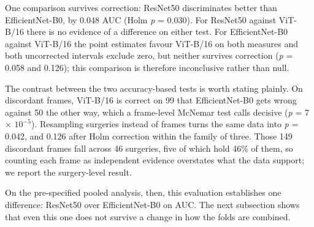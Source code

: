 \documentclass[preprint,12pt]{elsarticle}
\begin{document}
\begin{table}[t]
\centering
\caption{Pairwise comparison on the pooled out-of-fold predictions. Intervals and the first two \emph{p}-columns use surgery-level resampling; Holm correction is applied within the family of three comparisons.}
\label{tab:2}
\small
\setlength{\tabcolsep}{4pt}
\end{table}

One comparison survives correction: ResNet50 discriminates better than EfficientNet-B0, by 0.048 AUC (Holm \emph{p} = 0.030). For ResNet50 against ViT-B/16 there is no evidence of a difference on either test. For EfficientNet-B0 against ViT-B/16 the point estimates favour ViT-B/16 on both measures and both uncorrected intervals exclude zero, but neither survives correction (\emph{p} = 0.058 and 0.126); this comparison is therefore inconclusive rather than null.

The contrast between the two accuracy-based tests is worth stating plainly. On discordant frames, ViT-B/16 is correct on 99 that EfficientNet-B0 gets wrong against 50 the other way, which a frame-level McNemar test calls decisive (\emph{p} = 7 $\times$ $10^{-5}$). Resampling surgeries instead of frames turns the same data into \emph{p} = 0.042, and 0.126 after Holm correction within the family of three. Those 149 discordant frames fall across 46 surgeries, five of which hold 46\% of them, so counting each frame as independent evidence overstates what the data support; we report the surgery-level result.

On the pre-specified pooled analysis, then, this evaluation establishes one difference: ResNet50 over EfficientNet-B0 on AUC. The next subsection shows that even this one does not survive a change in how the folds are combined.
\end{document}
